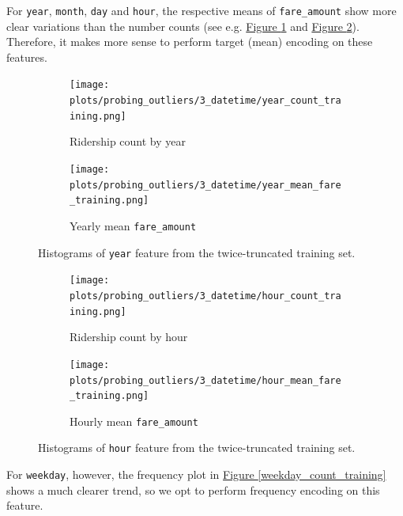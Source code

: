 \documentclass[12pt,letterpaper,final]{article}
\numberwithin{equation}{section}
\begin{document}
For \verb|year|, \verb|month|, \verb|day| and \verb|hour|, the respective means of \verb|fare_amount| show more clear variations than the number counts (see e.g. \hyperref[year_count_training]{Figure \ref*{year_count_training}} and \hyperref[hour_count_training]{Figure \ref*{hour_count_training}}). Therefore, it makes more sense to perform target (mean) encoding on these features.


\begin{figure}[H]
\centering
\begin{subfigure}{0.55\textwidth}
  \centering
  \texttt{[image: plots/probing\_outliers/3\_datetime/year\_count\_training.png]}
\caption{Ridership count by year}
\end{subfigure}%
\hspace*{-2cm}
\begin{subfigure}{.55\textwidth}
  \centering
  \texttt{[image: plots/probing\_outliers/3\_datetime/year\_mean\_fare\_training.png]}
  \caption{Yearly mean \texttt{fare\_amount}}
\end{subfigure}
\caption{Histograms of \texttt{year} feature from the twice-truncated training set.}
\label{year_count_training}
\end{figure}



\begin{figure}[H]
\centering
\begin{subfigure}{0.55\textwidth}
  \centering
  \texttt{[image: plots/probing\_outliers/3\_datetime/hour\_count\_training.png]}
\caption{Ridership count by hour}
\end{subfigure}%
\hspace*{-2cm}
\begin{subfigure}{.55\textwidth}
  \centering
  \texttt{[image: plots/probing\_outliers/3\_datetime/hour\_mean\_fare\_training.png]}
  \caption{Hourly mean \texttt{fare\_amount}}
\end{subfigure}
\caption{Histograms of \texttt{hour} feature from the twice-truncated training set.}
\label{hour_count_training}
\end{figure}



For \verb|weekday|, however, the frequency plot in \hyperref[weekday_count_training]{Figure \ref*{weekday_count_training}} shows a much clearer trend, so we opt to perform frequency encoding on this feature.
\end{document}
